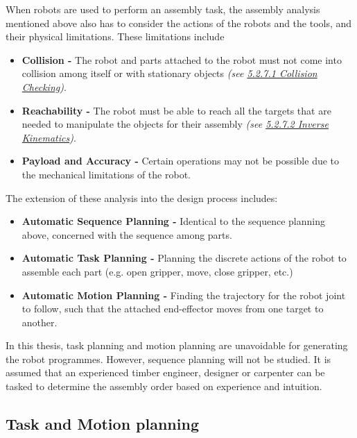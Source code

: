 When robots are used to perform an assembly task, the assembly analysis mentioned above also has to consider the actions of the robots and the tools, and their physical limitations. These limitations include

\begin{itemize}
    \item \textbf{Collision -} The robot and parts attached to the robot must not come into collision among itself or with stationary objects \textit{(see \ul{5.2.7.1 Collision Checking})}.

	\item \textbf{Reachability -} The robot must be able to reach all the targets that are needed to manipulate the objects for their assembly \textit{(see \ul{5.2.7.2 Inverse Kinematics})}.

	\item \textbf{Payload and Accuracy -} Certain operations may not be possible due to the mechanical limitations of the robot.
\end{itemize}

The extension of these analysis into the design process includes:

\begin{itemize}
	\item \textbf{Automatic Sequence Planning -} Identical to the sequence planning above, concerned with the sequence among parts.

	\item \textbf{Automatic Task Planning -} Planning the discrete actions of the robot to assemble each part (e.g. open gripper, move, close gripper, etc.) \parencite{homemdemelloTaskSequencePlanning1989}

	\item \textbf{Automatic Motion Planning -} Finding the trajectory for the robot joint to follow, such that the attached end-effector moves from one target to another. \parencite{lavallePlanningAlgorithms2006}
\end{itemize}

In this thesis, task planning and motion planning are unavoidable for generating the robot programmes. However, sequence planning will not be studied. It is assumed that an experienced timber engineer, designer or carpenter can be tasked to determine the assembly order based on experience and intuition.

\subsection{Task and Motion planning}

